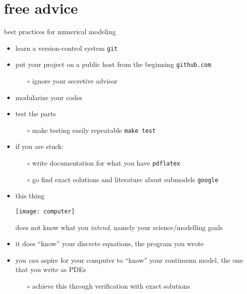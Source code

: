 \section{free advice}

\begin{frame}{best practices for numerical modeling}

\begin{itemize}
\item learn a version-control system \hfill \alert{\texttt{git}}
\item put your project on a public host from the beginning \hfill \alert{\texttt{github.com}}
  \begin{itemize}
  \item[$\circ$] ignore your secretive advisor
  \end{itemize}
\item modularize your codes
\item test the parts
  \begin{itemize}
  \item[$\circ$] make testing easily repeatable \hfill \alert{\texttt{make test}}
  \end{itemize}
\item if you are stuck:
  \begin{itemize}
  \item[$\circ$] write documentation for what you have \hfill \alert{\texttt{pdflatex}}
  \item[$\circ$] go find exact solutions and literature about submodels \hfill \alert{\texttt{google}}
  \end{itemize}
\end{itemize}
\end{frame}


\begin{frame}{}
\begin{itemize}
\item this thing

\vspace{-10mm}
\begin{center}
\texttt{[image: computer]}
\end{center}
\alert{does not know what you \emph{intend}}, namely your science/modelling goals

\bigskip
\item it does ``know'' your discrete equations, the program you wrote
\item you \emph{can} aspire for your computer to ``know'' your continuum model, the one that you write as PDEs
   \begin{itemize}
   \item[$\circ$] achieve this through verification with exact solutions
   \end{itemize}
\end{itemize}

\end{frame}
